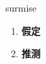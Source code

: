 
\begin{frame}
{\huge surmise}
\begin{center}
\begin{enumerate}\Large
  \item \textbf{假定}
  \item \textbf{推测}
\end{enumerate}
\end{center}
\end{frame}
